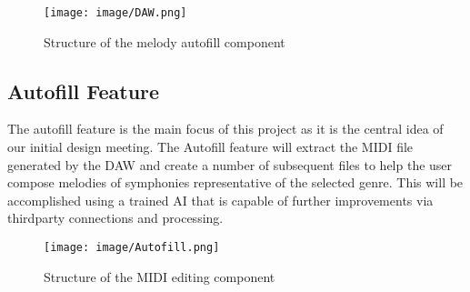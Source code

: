 \begin{figure}[h!]
  \centering
  \texttt{[image: image/DAW.png]}
  \caption{Structure of the melody autofill component}
  \label{fig:daw_diagram}
\end{figure}

\newpage
\subsection{Autofill Feature}

The autofill feature is the main focus of this project as it is the central idea of our
initial design meeting. The Autofill feature will extract the MIDI file generated by the
DAW and create a number of subsequent files to help the user compose melodies of
symphonies representative of the selected genre. This will be accomplished using a trained
AI that is capable of further improvements via thirdparty connections and processing.

\begin{figure}[h!]
  \centering
  \texttt{[image: image/Autofill.png]}
  \caption{Structure of the MIDI editing component}
  \label{fig:autofill_diagram}
\end{figure}
\clearpage
